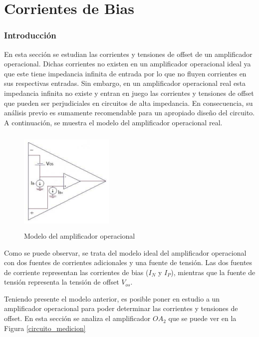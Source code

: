 
\part{Corrientes de Bias}
\section{Introducción}

En esta sección se estudian las corrientes y tensiones de offset de un amplificador operacional. Dichas corrientes no existen en un amplificador operacional
ideal ya que este tiene impedancia infinita de entrada por lo que no fluyen corrientes en sus respectivas entradas. Sin embargo, en un amplificador operacional real 
esta impedancia infinita no existe y entran en juego las corrientes y tensiones de offset que pueden ser perjudiciales en circuitos de alta impedancia. En consecuencia, su análisis previo es sumamente recomendable para un apropiado diseño del
circuito. A continuación, se muestra el modelo del amplificador operacional real.

\begin{figure}[ht]                                                       
    \centering\includegraphics[width=0.4\textwidth, height=5cm]{../Ex3/Figuras/fig_0.png}
     \caption{Modelo del amplificador operacional}
     \label{fig_0}
     \end{figure}


Como se puede observar, se trata del modelo ideal del amplificador operacional con dos fuentes de corrientes adicionales y una fuente de tensión.
Las dos fuentes de corriente representan las corrientes de bias ($I_N$ y $I_P$), mientras que la fuente de tensión representa la tensión de offset $V_{os}$.

Teniendo presente el modelo anterior, es posible poner en estudio a un amplificador operacional para poder determinar las corrientes y tensiones de offset. En esta sección se analiza el
amplificador $OA_2$ que se puede ver en la Figura \ref{circuito_medicion}



